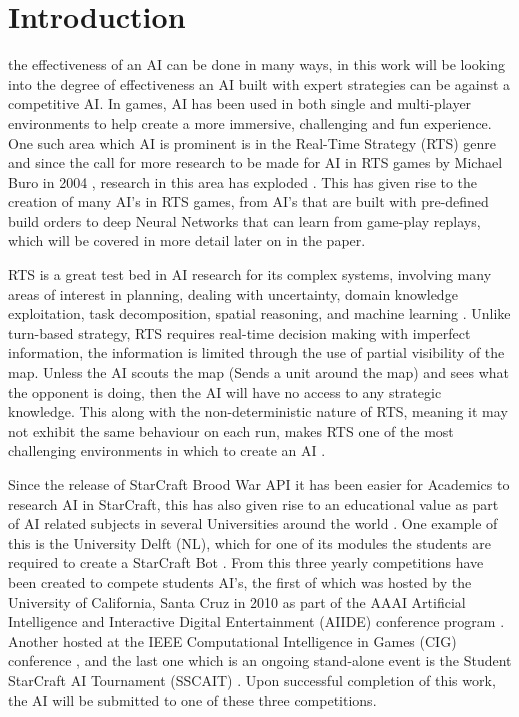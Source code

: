 \documentclass[journal]{IEEEtran}
\begin{document}
\section{Introduction}
 the effectiveness of an AI can be done in many ways, in this work will be looking into the degree of effectiveness an AI built with expert strategies can be against a competitive AI. %
In games, AI has been used in both single and multi-player environments to help create a more immersive, challenging and fun experience. One such area which AI is prominent is in the Real-Time Strategy (RTS) genre and since the call for more research to be made for AI in RTS games by Michael Buro in 2004 \cite{CallFor}, research in this area has exploded \cite{Survey}. This has given rise to the creation of many AI's in RTS games, from AI's that are built with pre-defined build orders \cite{Swen} to deep Neural Networks \cite{Deep} that can learn from game-play replays, which will be covered in more detail later on in the paper.

RTS is a great test bed in AI research for its complex systems, involving many areas of interest in planning, dealing with uncertainty, domain knowledge exploitation, task decomposition, spatial reasoning, and machine learning \cite{StarCraftBot}. Unlike turn-based strategy, RTS requires real-time decision making with imperfect information, the information is limited through the use of partial visibility of the map. Unless the AI scouts the map (Sends a unit around the map) and sees what the opponent is doing, then the AI will have no access to any strategic knowledge. This along with the non-deterministic nature of RTS, meaning it may not exhibit the same behaviour on each run, makes RTS one of the most challenging environments in which to create an AI \cite{Current}.

Since the release of StarCraft Brood War API it has been easier for Academics to research AI in StarCraft, this has also given rise to an educational value as part of AI related subjects in several Universities around the world \cite{Current}. One example of this is the University Delft (NL), which for one of its modules the students are required to create a StarCraft Bot \cite{NL}. From this three yearly competitions have been created to compete students AI's, the first of which was hosted by the University of California, Santa Cruz in 2010 as part of the AAAI Artificial Intelligence and Interactive Digital Entertainment (AIIDE) conference program \cite{AIIDE}. Another hosted at the IEEE Computational Intelligence in Games (CIG) conference \cite{CIG}, and the last one which is an ongoing stand-alone event is the Student StarCraft AI Tournament (SSCAIT) \cite{StarCraftBot}. Upon successful completion of this work, the AI will be submitted to one of these three competitions.
\end{document}
